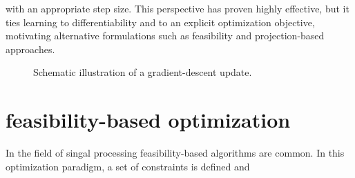 with an appropriate step size. This perspective has proven highly effective, but it ties learning to differentiability and to an explicit optimization objective, motivating alternative formulations such as feasibility and projection-based approaches.

\begin{figure}[t]
  \centering
  
  \caption{Schematic illustration of a gradient-descent update.}
  \label{fig:gradient-descent}
\end{figure}


\section{feasibility-based optimization}
In the field of singal processing feasibility-based algorithms are common. In this optimization paradigm, a set of constraints is defined and 